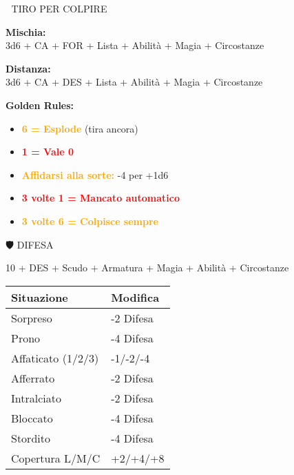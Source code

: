 \documentclass[10pt,a4paper,landscape]{article}
\newcommand{\highlight}[1]{\textcolor{orange}{\textbf{#1}}}
\newcommand{\critical}[1]{\textcolor{red}{\textbf{#1}}}
\begin{document}
\begin{multicols}{4}
		\begin{mainsection}{🎯 TIRO PER COLPIRE}
			\begin{formula}
				\textbf{Mischia:}\\
				3d6 + CA + FOR + Lista + Abilità + Magia + Circostanze
			\end{formula}

			\begin{formula}
				\textbf{Distanza:}\\
				3d6 + CA + DES + Lista + Abilità + Magia + Circostanze
			\end{formula}

			\textbf{Golden Rules:}
			\begin{itemize}[noitemsep,leftmargin=8pt]
				\item \highlight{6 = Esplode} (tira ancora)
				\item \critical{1 = Vale 0}
				\item \highlight{Affidarsi alla sorte:} -4 per +1d6
				\item \critical{3 volte 1 = Mancato automatico}
				\item \highlight{3 volte 6 = Colpisce sempre}
			\end{itemize}
		\end{mainsection}

		\begin{mainsection}{🛡️ DIFESA}
			\begin{formula}
				10 + DES + Scudo + Armatura + Magia + Abilità + Circostanze
			\end{formula}

			\begin{tabular}{@{}ll@{}}
				\toprule
				\textbf{Situazione} & \textbf{Modifica} \\
				\midrule
				Sorpreso & -2 Difesa \\
				Prono & -4 Difesa \\
				Affaticato (1/2/3) & -1/-2/-4 \\
				Afferrato & -2 Difesa \\
				Intralciato & -2 Difesa \\
				Bloccato & -4 Difesa \\
				Stordito & -4 Difesa \\
				Copertura L/M/C & +2/+4/+8 \\
				\bottomrule
			\end{tabular}
		\end{mainsection}

		\columnbreak


\end{multicols}
\end{document}
